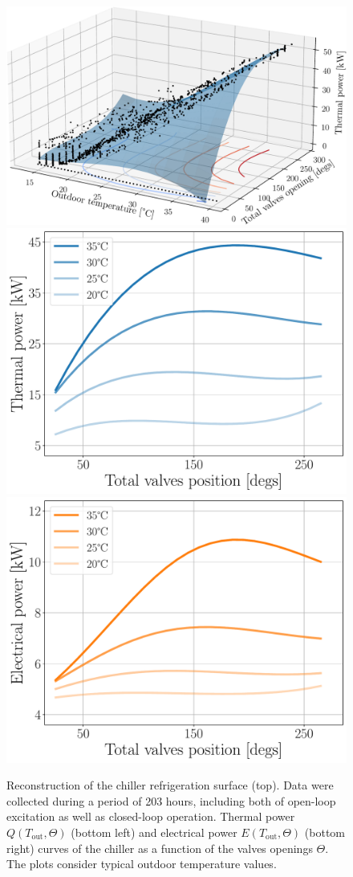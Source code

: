 \begin{figure}[!t]
	\centering
	\includegraphics[width=0.5\linewidth]{../images/chap3_thermal_surface.pdf}  \\[14pt]
	\hspace{10pt}\includegraphics[width=0.4\linewidth]{../images/chap3_ther_energy.pdf} \hspace{3pt}
	\includegraphics[width=0.4\linewidth]{../images/chap3_elec_energy.pdf}
	\caption{Reconstruction of the chiller refrigeration surface (top). Data were collected during a period of 203 hours, including both of open-loop excitation as well as closed-loop operation. Thermal power $Q(T_\text{out},\Theta)$ (bottom left) and electrical power $E(T_\text{out},\Theta)$ (bottom right) curves of the chiller as a function of the valves openings $\Theta$. The plots consider typical outdoor temperature values.}
	\label{fig.thermalAndElectrical}
\end{figure}

